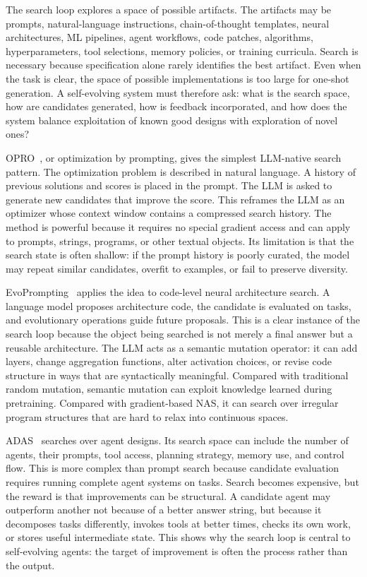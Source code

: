 The search loop explores a space of possible artifacts.  The artifacts may be prompts, natural-language instructions, chain-of-thought templates, neural architectures, ML pipelines, agent workflows, code patches, algorithms, hyperparameters, tool selections, memory policies, or training curricula.  Search is necessary because specification alone rarely identifies the best artifact.  Even when the task is clear, the space of possible implementations is too large for one-shot generation.  A self-evolving system must therefore ask: what is the search space, how are candidates generated, how is feedback incorporated, and how does the system balance exploitation of known good designs with exploration of novel ones?

OPRO~\cite{opro2023}, or optimization by prompting, gives the simplest LLM-native search pattern.  The optimization problem is described in natural language.  A history of previous solutions and scores is placed in the prompt.  The LLM is asked to generate new candidates that improve the score.  This reframes the LLM as an optimizer whose context window contains a compressed search history.  The method is powerful because it requires no special gradient access and can apply to prompts, strings, programs, or other textual objects.  Its limitation is that the search state is often shallow: if the prompt history is poorly curated, the model may repeat similar candidates, overfit to examples, or fail to preserve diversity.

EvoPrompting~\cite{evoprompting2023} applies the idea to code-level neural architecture search.  A language model proposes architecture code, the candidate is evaluated on tasks, and evolutionary operations guide future proposals.  This is a clear instance of the search loop because the object being searched is not merely a final answer but a reusable architecture.  The LLM acts as a semantic mutation operator: it can add layers, change aggregation functions, alter activation choices, or revise code structure in ways that are syntactically meaningful.  Compared with traditional random mutation, semantic mutation can exploit knowledge learned during pretraining.  Compared with gradient-based NAS, it can search over irregular program structures that are hard to relax into continuous spaces.

ADAS~\cite{adas2025} searches over agent designs.  Its search space can include the number of agents, their prompts, tool access, planning strategy, memory use, and control flow.  This is more complex than prompt search because candidate evaluation requires running complete agent systems on tasks.  Search becomes expensive, but the reward is that improvements can be structural.  A candidate agent may outperform another not because of a better answer string, but because it decomposes tasks differently, invokes tools at better times, checks its own work, or stores useful intermediate state.  This shows why the search loop is central to self-evolving agents: the target of improvement is often the process rather than the output.


